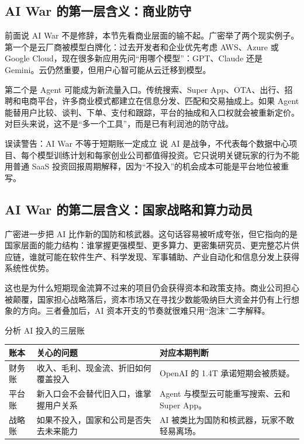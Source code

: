 \documentclass[a4paper]{article}
\begin{document}
\subsection{AI War 的第一层含义：商业防守}

前面说 AI War 不是修辞，本节先看商业层面的输不起。广密举了两个现实例子。第一个是云厂商被模型白牌化：过去开发者和企业优先考虑 AWS、Azure 或 Google Cloud，现在很多新应用先问“用哪个模型”：GPT、Claude 还是 Gemini。云仍然重要，但用户心智可能从云迁移到模型。

第二个是 Agent 可能成为新流量入口。传统搜索、Super App、OTA、出行、招聘和电商平台，许多商业模式都建立在信息分发、匹配和交易抽成上。如果 Agent 能替用户比较、谈判、下单、支付和跟踪，平台的抽成和入口权就会被重新定价。对巨头来说，这不是“多一个工具”，而是已有利润池的防守战。

\begin{warningbox}{误读警告：AI War 不等于短期账一定成立}
说 AI 是战争，不代表每个数据中心项目、每个模型训练计划和每家创业公司都值得投资。它只说明关键玩家的行为不能用普通 SaaS 投资回报周期解释，因为“不投入”的机会成本可能是平台地位被重写。
\end{warningbox}

\subsection{AI War 的第二层含义：国家战略和算力动员}

广密进一步把 AI 比作新的国防和核武器。这句话容易被听成夸张，但它指向的是国家层面的能力结构：谁掌握更强模型、更多算力、更密集研究员、更完整芯片供应链，谁就可能在软件生产、科学发现、军事辅助、产业自动化和信息分发上获得系统性优势。

这也是为什么短期现金流算不过来的项目仍会获得资本和政策支持。商业公司担心被颠覆，国家担心战略落后，资本市场又在寻找少数能吸纳巨大资金并仍有上行想象的方向。三者叠加后，AI 资本开支的节奏就很难只用“泡沫”二字解释。

\begin{importantbox}{分析 AI 投入的三层账}
\begin{tabularx}{\textwidth}{p{}p{}X}
\toprule
账本 & 关心的问题 & 对应本期判断 \\
\midrule
财务账 & 收入、毛利、现金流、折旧如何覆盖投入 & OpenAI 的 1.4T 承诺短期会被质疑。 \\
平台账 & 新入口会不会替代旧入口，谁掌握用户关系 & Agent 与模型云可能重写搜索、云和 Super App。 \\
战略账 & 如果不投入，国家和公司是否失去未来能力 & AI 被类比为国防和核武器，玩家不敢轻易离场。 \\
\bottomrule
\end{tabularx}
\end{importantbox}
\end{document}
